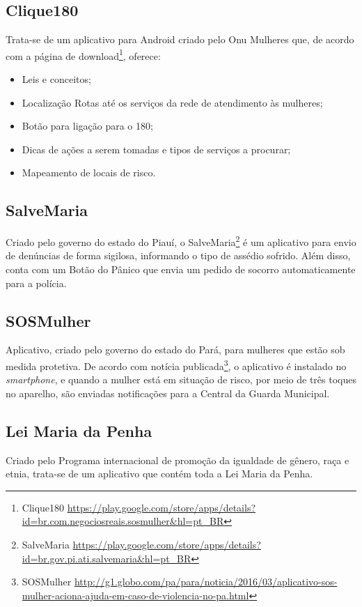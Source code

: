 \subsection*{Clique180}
Trata-se de um aplicativo para Android criado pelo Onu Mulheres que, de acordo com
a página de download\footnote{Clique180 \url{https://play.google.com/store/apps/details?id=br.com.negociosreais.sosmulher&hl=pt_BR}}, oferece:

\begin{itemize}
	\item Leis e conceitos;
	\item Localização Rotas até os serviços da rede de atendimento às mulheres;
	\item Botão para ligação para o 180;
	\item Dicas de ações a serem tomadas e tipos de serviços a procurar; 
	\item Mapeamento de locais de risco.
\end{itemize}

\subsection*{SalveMaria}
Criado pelo governo do estado do Piauí, o SalveMaria\footnote{SalveMaria \url{https://play.google.com/store/apps/details?id=br.gov.pi.ati.salvemaria&hl=pt_BR}} é um aplicativo para envio de denúncias
de forma sigilosa, informando o tipo de assédio sofrido.
Além disso, conta com um Botão do Pânico que envia um pedido de socorro automaticamente para a polícia.

\subsection*{SOSMulher}
Aplicativo, criado pelo governo do estado do Pará, para mulheres que estão sob medida protetiva. 
De acordo com notícia publicada\footnote{SOSMulher \url{http://g1.globo.com/pa/para/noticia/2016/03/aplicativo-sos-mulher-aciona-ajuda-em-caso-de-violencia-no-pa.html}}, o aplicativo é instalado no \textit{smartphone}, e quando a mulher está em situação de risco, por meio de três toques no aparelho, são enviadas notificações para a Central da Guarda Municipal.

\subsection*{Lei Maria da Penha}
Criado pelo Programa internacional de promoção da igualdade de gênero, raça e etnia, trata-se de um
aplicativo que contém toda a Lei Maria da Penha.

